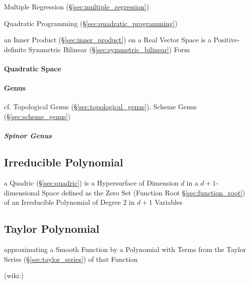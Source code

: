 \fist Multiple Regression (\S\ref{sec:multiple_regression})

\fist Quadratic Programming (\S\ref{sec:quadratic_programming})

an Inner Product (\S\ref{sec:inner_product}) on a Real Vector Space is
a Positive-definite Symmetric Bilinear
(\S\ref{sec:symmetric_bilinear}) Form



\paragraph{Quadratic Space}\label{sec:quadratic_space}\hfill

\paragraph{Genus}\label{sec:quadratic_genus}\hfill

\fist cf. Topological Genus (\S\ref{sec:topological_genus}), Scheme Genus
(\S\ref{sec:scheme_genus})



\subparagraph{Spinor Genus}\label{sec:spinor_genus}\hfill



\subsection{Irreducible Polynomial}\label{sec:irreducible_polynomial}

\fist a Quadric (\S\ref{sec:quadric}) is a Hypersurface of Dimension $d$ in a
$d+1$-dimensional Space defined as the Zero Set (Function Root
\S\ref{sec:function_root}) of an Irreducible Polynomial of Degree $2$ in $d+1$
Variables



\subsection{Taylor Polynomial}\label{sec:taylor_polynomial}

approximating a Smooth Function by a Polynomial with Terms from the
Taylor Series (\S\ref{sec:taylor_series}) of that Function

(wiki:)

